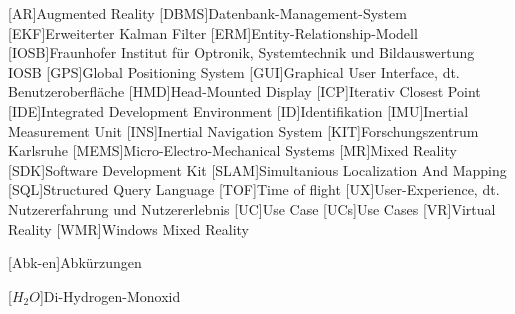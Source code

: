 \begin{acronym}[DHBW]
 [AR]{Augmented Reality}
 [DBMS]{Datenbank-Management-System}
 [EKF]{Erweiterter Kalman Filter}
 [ERM]{Entity-Relationship-Modell}
 [IOSB]{Fraunhofer Institut für Optronik, Systemtechnik und Bildauswertung IOSB}
 [GPS]{Global Positioning System}
 [GUI]{Graphical User Interface, dt. Benutzeroberfläche}
 [HMD]{Head-Mounted Display}
 [ICP]{Iterativ Closest Point}
 [IDE]{Integrated Development Environment}
 [ID]{Identifikation}
 [IMU]{Inertial Measurement Unit}
 [INS]{Inertial Navigation System}
 [KIT]{Forschungszentrum Karlsruhe}
 [MEMS]{Micro-Electro-Mechanical Systems}
 [MR]{Mixed Reality}
 [SDK]{Software Development Kit}
 [SLAM]{Simultanious Localization And Mapping}
 [SQL]{Structured Query Language}
 [TOF]{Time of flight}
 [UX]{User-Experience, dt. Nutzererfahrung und Nutzererlebnis}
 [UC]{Use Case}
 [UCs]{Use Cases}
 [VR]{Virtual Reality}
 [WMR]{Windows Mixed Reality}

 [Abk-en]{Abkürzungen}


 [\ensuremath{H_2O}]{Di-Hydrogen-Monoxid}

\end{acronym}
